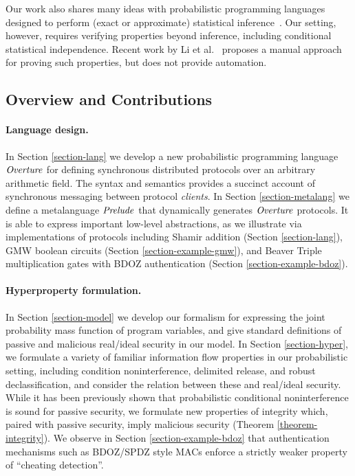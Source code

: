 Our work also shares many ideas with probabilistic programming
languages designed to perform (exact or approximate) statistical
inference~\cite{holtzen2020scaling, carpenter2017stan, wood2014new,
  bingham2019pyro, albarghouthi2017fairsquare, de2007problog,
  pfeffer2009figaro, saad2021sppl}. Our setting, however, requires
verifying properties beyond inference, including conditional
statistical independence. Recent work by Li et al.~\cite{li2023lilac} proposes a
manual approach for proving such properties, but does not provide
automation.

\subsection{Overview and Contributions}

\paragraph{Language design.} In Section \ref{section-lang} we
develop a new probabilistic programming language $\mathit{Overture}$ for
defining synchronous distributed protocols over an arbitrary
arithmetic field. The syntax and semantics provides a succinct account
of synchronous messaging between protocol \emph{clients}. In Section
\ref{section-metalang} we define a metalanguage $\mathit{Prelude}$ that
dynamically generates $\mathit{Overture}$ protocols. It is able to express
important low-level abstractions, as we illustrate via implementations
of protocols including Shamir addition (Section \ref{section-lang}),
GMW boolean circuits (Section \ref{section-example-gmw}), and Beaver
Triple multiplication gates with BDOZ authentication (Section
\ref{section-example-bdoz}).

\paragraph{Hyperproperty formulation.} In Section \ref{section-model} we
develop our formalism for expressing the joint probability mass function of
program variables, and give standard definitions of passive and
malicious real/ideal security in our model. In Section
\ref{section-hyper}, we formulate a variety of familiar information
flow properties in our probabilistic setting, including condition
noninterference, delimited release, and robust declassification, and
consider the relation between these and real/ideal security.  While it
has been previously shown that probabilistic conditional
noninterference is sound for passive security, we formulate new
properties of integrity which, paired with passive security, imply
malicious security (Theorem \ref{theorem-integrity}). We observe
in Section \ref{section-example-bdoz} that authentication mechanisms
such as BDOZ/SPDZ style MACs enforce a strictly weaker property
of ``cheating detection''. 


